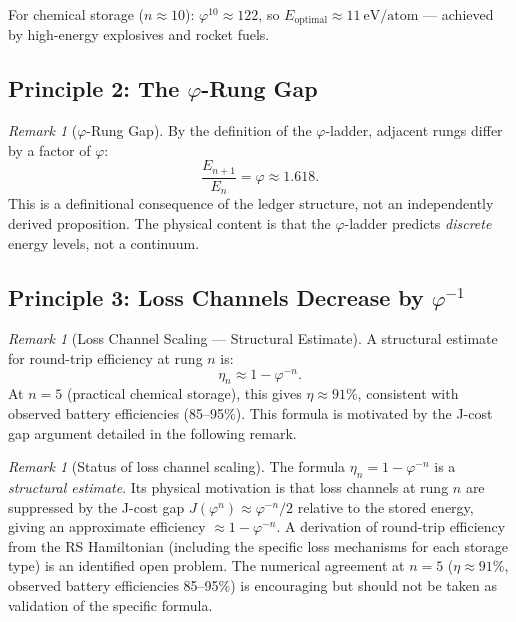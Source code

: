 \documentclass[12pt,a4paper]{article}
\theoremstyle{definition}
\theoremstyle{remark}
\newtheorem{remark}[theorem]{Remark}
\begin{document}
For chemical storage ($n \approx 10$): $\varphi^{10} \approx 122$, so 
$E_\mathrm{optimal} \approx 11~\mathrm{eV/atom}$ --- achieved by high-energy 
explosives and rocket fuels.

\subsection{Principle 2: The $\varphi$-Rung Gap}

\begin{remark}[$\varphi$-Rung Gap]
\label{rem:phi-gap}
By the definition of the $\varphi$-ladder, adjacent rungs differ by a factor
of $\varphi$:
\begin{equation}
\frac{E_{n+1}}{E_n} = \varphi \approx 1.618.
\end{equation}
This is a definitional consequence of the ledger structure, not an
independently derived proposition.  The physical content is that the
$\varphi$-ladder predicts \emph{discrete} energy levels, not a continuum.
\end{remark}

\subsection{Principle 3: Loss Channels Decrease by $\varphi^{-1}$}

\begin{remark}[Loss Channel Scaling --- Structural Estimate]
\label{rem:loss}
A structural estimate for round-trip efficiency at rung $n$ is:
\begin{equation}
\eta_n \approx 1 - \varphi^{-n}.
\end{equation}
At $n = 5$ (practical chemical storage), this gives $\eta \approx 91\%$,
consistent with observed battery efficiencies (85--95\%).  This formula
is motivated by the J-cost gap argument detailed in the following remark.
\end{remark}

\begin{remark}[Status of loss channel scaling]
The formula $\eta_n = 1 - \varphi^{-n}$ is a \emph{structural estimate}.
Its physical motivation is that loss channels at rung $n$ are suppressed
by the J-cost gap $J(\varphi^n) \approx \varphi^{-n}/2$ relative to the
stored energy, giving an approximate efficiency $\approx 1 - \varphi^{-n}$.
A derivation of round-trip efficiency from the RS Hamiltonian (including
the specific loss mechanisms for each storage type) is an identified open
problem.  The numerical agreement at $n=5$ ($\eta \approx 91\%$, observed
battery efficiencies 85--95\%) is encouraging but should not be taken as
validation of the specific formula.
\end{remark}
\end{document}
